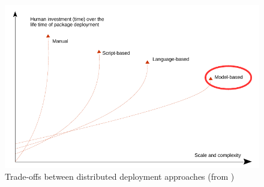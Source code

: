 \begin{figure}
	\centering
	\includegraphics[width=1\columnwidth]{chapters/stateOfTheArt.images/TradeoffsDeployment.pdf}
	\caption{Trade-offs between distributed deployment approaches (from  \cite{talwar2005approaches})}
	\label{fig:tradeoffsDeployment}
\end{figure}

